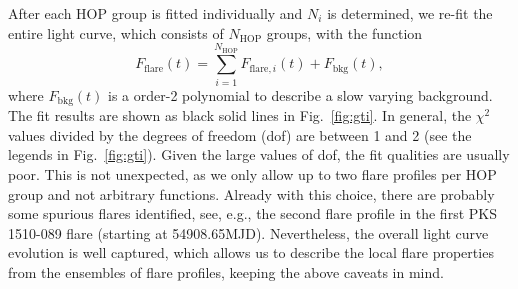 \documentclass[twocolumn]{aastex62}
\begin{document}
After each HOP group is fitted individually and $N_i$ is determined, 
we re-fit the entire light curve, which consists of $N_\mathrm{HOP}$ groups, with the function 
\begin{equation}
    F_\mathrm{flare}(t) = \sum\limits_{i = 1}^{N_\mathrm{HOP}}F_{\mathrm{flare},i}(t) + F_\mathrm{bkg}(t),
\end{equation}
where $F_\mathrm{bkg}(t)$ is a order-2 polynomial to describe a slow  varying background.
The fit results are shown as black solid lines in Fig.~\ref{fig:gti}.
In general, the $\chi^2$ values divided by the degrees of freedom (dof) are between 1 and 2 (see the legends in Fig.~\ref{fig:gti}). Given the large values of dof, the fit qualities are usually poor. This is not unexpected, as we only allow up to two flare profiles per HOP group and not arbitrary functions. Already with this choice, there are probably some spurious flares identified, see, e.g., the second flare profile in the first PKS\,1510-089 flare (starting at 54908.65MJD). 
Nevertheless, the overall light curve evolution is well captured, which allows us to describe the local flare properties from the ensembles of flare profiles, keeping the above caveats in mind. 
\end{document}
